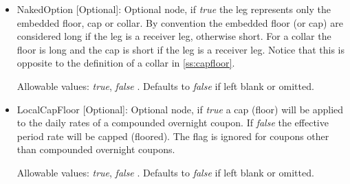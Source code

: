 \begin{itemize}
\item NakedOption [Optional]: Optional node, if \emph{true} the leg represents only the embedded floor, cap or collar.
  By convention the embedded floor (or cap) are considered long if the leg is a receiver leg, otherwise short. For a
  collar the floor is long and the cap is short if the leg is a receiver leg. Notice that this is opposite to
  the definition of a collar in \ref{ss:capfloor}.

 Allowable values: \emph{true}, \emph{false} . Defaults to \emph{false} if left blank or omitted.

\item LocalCapFloor [Optional]: Optional node, if \emph{true} a cap (floor) will be applied to the daily rates of a
  compounded overnight coupon. If \emph{false} the effective period rate will be capped (floored). The flag is ignored
  for coupons other than compounded overnight coupons.

 Allowable values: \emph{true}, \emph{false} . Defaults to \emph{false} if left blank or omitted.

\end{itemize}

